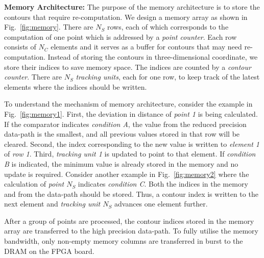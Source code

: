 \noindent \textbf{Memory Architecture:}
The purpose of the memory architecture is to store the contours that require re-computation.
We design a memory array as shown in Fig.~\ref{fig:memory}.
There are $N_S$ rows, each of which corresponds to the computation of one point which is addressed by a \textit{point counter}.
Each row consists of $N_C$ elements and it serves as a buffer for contours that may need re-computation.
Instead of storing the contours in three-dimensional coordinate, we store their indices to save memory space.
The indices are counted by a \textit{contour counter}.
There are $N_S$ \textit{tracking units}, each for one row, to keep track of the latest elements where the indices should be written.

To understand the mechanism of memory architecture, consider the example in Fig.~\ref{fig:memory1}.
First, the deviation in distance of \textit{point 1} is being calculated.
If the comparator indicates \emph{condition A}, the value from the reduced precision data-path is the smallest, and all previous values stored in that row will be cleared.
Second, the index corresponding to the new value is written to \textit{element 1} of \textit{row 1}.
Third, \textit{tracking unit 1} is updated to point to that element.
If \emph{condition B} is indicated, the minimum value is already stored in the memory and no update is required.
Consider another example in Fig.~\ref{fig:memory2} where the calculation of \textit{point $N_S$} indicates \emph{condition C}. 
Both the indices in the memory and from the data-path should be stored.
Thus, a contour index is written to the next element and \textit{tracking unit $N_S$} advances one element further.

After a group of points are processed, the contour indices stored in the memory array are transferred to the high precision data-path.
To fully utilise the memory bandwidth, only non-empty memory columns are transferred in burst to the DRAM on the FPGA board.

